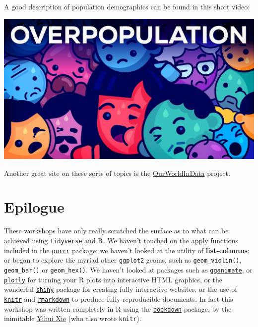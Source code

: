 \documentclass[]{book}
\theoremstyle{definition}
\theoremstyle{definition}
\theoremstyle{definition}
\theoremstyle{remark}
\begin{document}
A good description of population demographics can be found in this short
video:

\begin{center}\includegraphics{images/population} \end{center}

Another great site on these sorts of topics is the
\href{https://ourworldindata.org/}{OurWorldInData} project.

\chapter{Epilogue}\label{epilogue}

These workshops have only really scratched the surface as to what can be
achieved using \texttt{tidyverse} and R. We haven't touched on the apply
functions included in the
\href{https://github.com/rstudio/cheatsheets/raw/master/purrr.pdf}{\texttt{purrr}}
package; we haven't looked at the utility of \textbf{list-columns}; or
began to explore the myriad other \texttt{ggplot2} geoms, such as
\texttt{geom\_violin()}, \texttt{geom\_bar()} or \texttt{geom\_hex()}.
We haven't looked at packages such as
\href{https://github.com/thomasp85/gganimate}{\texttt{gganimate}}, or
\href{https://plot.ly/r/}{\texttt{plotly}} for turning your R plots into
interactive HTML graphics, or the wonderful
\href{https://shiny.rstudio.com/gallery/}{\texttt{shiny}} package for
creating fully interactive websites, or the use of
\href{https://yihui.name/knitr/}{\texttt{knitr}} and
\href{https://rmarkdown.rstudio.com/}{\texttt{rmarkdown}} to produce
fully reproducible documents. In fact this workshop was written
completely in R using the
\href{https://bookdown.org/yihui/bookdown/}{\texttt{bookdown}} package,
by the inimitable \href{https://en.wikipedia.org/wiki/Yihui_Xie}{Yihui
Xie} (who also wrote \texttt{knitr}).
\end{document}

